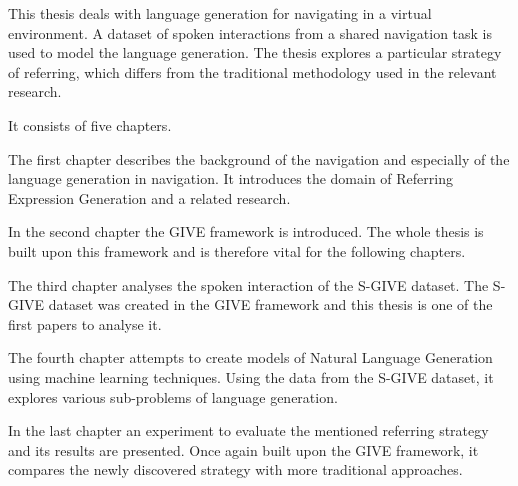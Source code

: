 This thesis deals with language generation for navigating in a virtual environment. A dataset of spoken interactions from a shared navigation task is used to model the language generation. The thesis explores a particular strategy of referring, which differs from the traditional methodology used in the relevant research. 

It consists of five chapters.

The first chapter describes the background of the navigation and especially of the language generation in navigation. It introduces the domain of Referring Expression Generation and a related research.

In the second chapter the GIVE framework is introduced. The whole thesis is built upon this framework and is therefore vital for the following chapters. 

The third chapter analyses the spoken interaction of the S-GIVE dataset. The S-GIVE dataset was created in the GIVE framework and this thesis is one of the first papers to analyse it.

The fourth chapter attempts to create models of Natural Language Generation using machine learning techniques. Using the data from the S-GIVE dataset, it explores various sub-problems of language generation.

In the last chapter an experiment to evaluate the mentioned referring strategy and its results are presented. Once again built upon the GIVE framework, it compares the newly discovered strategy with more traditional approaches.   